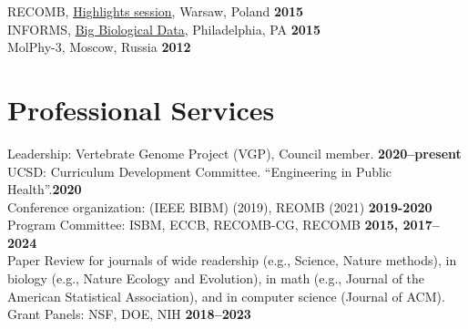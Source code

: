 \documentclass[margin,line,letterpaper]{resume}
\begin{document}
\begin{resume}
         RECOMB, \href{http://recomb2015.mimuw.edu.pl/node/6.html}{Highlights session}, Warsaw, Poland %
         \hfill \textbf{2015}\\
         INFORMS, \href{http://meetings2.informs.org/wordpress/philadelphia/files/2015/10/Monday.pdf}{Big Biological Data}, Philadelphia, PA %
         \hfill \textbf{2015}\\
         MolPhy-3, Moscow, Russia %
         \hfill \textbf{2012}\vspace{1mm}
    \section{\mysidestyle Professional Services}
    Leadership: Vertebrate Genome Project (VGP), Council member.   \hfill \textbf{2020--present}\vspace{1mm}\\
    UCSD: Curriculum Development Committee. ``Engineering in Public Health''.\hfill \textbf{2020}\vspace{1mm} \\
     Conference organization: (IEEE BIBM) (2019), REOMB (2021)   \hfill \textbf{2019-2020}\vspace{1mm}\\
    Program Committee: ISBM, ECCB, RECOMB-CG, RECOMB  \hfill \textbf{2015, 2017--2024}\vspace{1mm}\\
    Paper Review for journals of wide readership (e.g., Science, Nature methods), in biology (e.g.,  Nature Ecology and Evolution), in math (e.g., Journal of the American Statistical Association), and in computer science (Journal of ACM). \\
Grant Panels:  NSF, DOE, NIH  \hfill \textbf{2018--2023}


\end{resume}
\end{document}
